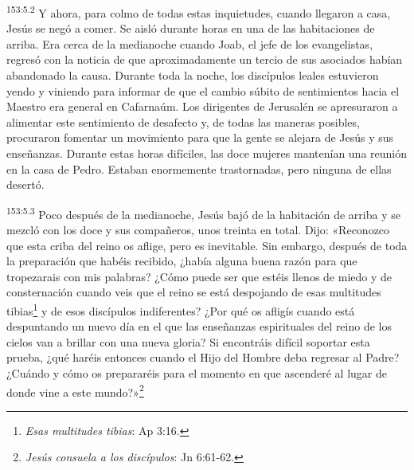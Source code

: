 \par
\textsuperscript{153:5.2} Y ahora, para colmo de todas estas inquietudes, cuando llegaron a casa, Jesús se negó a comer. Se aisló durante horas en una de las habitaciones de arriba. Era cerca de la medianoche cuando Joab, el jefe de los evangelistas, regresó con la noticia de que aproximadamente un tercio de sus asociados habían abandonado la causa. Durante toda la noche, los discípulos leales estuvieron yendo y viniendo para informar de que el cambio súbito de sentimientos hacia el Maestro era general en Cafarnaúm. Los dirigentes de Jerusalén se apresuraron a alimentar este sentimiento de desafecto y, de todas las maneras posibles, procuraron fomentar un movimiento para que la gente se alejara de Jesús y sus enseñanzas. Durante estas horas difíciles, las doce mujeres mantenían una reunión en la casa de Pedro. Estaban enormemente trastornadas, pero ninguna de ellas desertó.

\par
\textsuperscript{153:5.3} Poco después de la medianoche, Jesús bajó de la habitación de arriba y se mezcló con los doce y sus compañeros, unos treinta en total. Dijo: «Reconozco que esta criba del reino os aflige, pero es inevitable. Sin embargo, después de toda la preparación que habéis recibido, ¿había alguna buena razón para que tropezarais con mis palabras? ¿Cómo puede ser que estéis llenos de miedo y de consternación cuando veis que el reino se está despojando de esas multitudes tibias\footnote{\textit{Esas multitudes tibias}: Ap 3:16.} y de esos discípulos indiferentes? ¿Por qué os afligís cuando está despuntando un nuevo día en el que las enseñanzas espirituales del reino de los cielos van a brillar con una nueva gloria? Si encontráis difícil soportar esta prueba, ¿qué haréis entonces cuando el Hijo del Hombre deba regresar al Padre? ¿Cuándo y cómo os prepararéis para el momento en que ascenderé al lugar de donde vine a este mundo?»\footnote{\textit{Jesús consuela a los discípulos}: Jn 6:61-62.}

